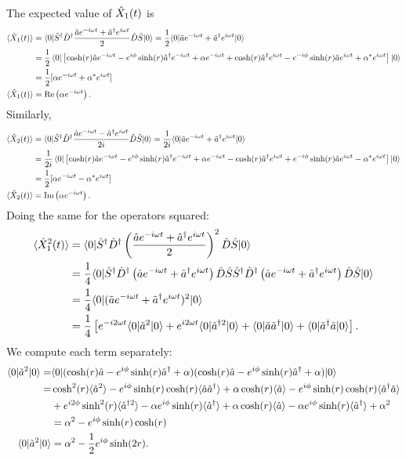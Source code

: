 The expected value of $\hat{X}_1(t)$ is 
\begin{align*}
\langle\hat{X}_1(t)\rangle&=\langle0|\hat{S}^\dagger\hat{D}^\dagger\frac{\hat{a} e^{-i\omega t}+\hat{a}^\dagger e^{i\omega t}}{2}\hat{D}\hat{S}|0\rangle=\frac{1}{2}\langle0|\tilde{a}e^{-i\omega t}+\tilde{a}^\dagger e^{i\omega t}|0\rangle\\
&=\frac{1}{2}\left\langle0\right|\left[\cosh(r)\hat{a} e^{-i\omega t}-e^{i\phi}\sinh(r)\hat{a}^\dagger e^{-i\omega t}+\alpha e^{-i\omega t}+\cosh(r)\hat{a}^\dagger e^{i\omega t}
-e^{-i\phi}\sinh(r)\hat{a} e^{i\omega t}+\alpha^*e^{i\omega t}\right]\left|0\right\rangle\\
&=\frac{1}{2}[\alpha e^{-i\omega t}+\alpha^*e^{i\omega t}]\\
\langle\hat{X}_1(t)\rangle&=\text{Re}\left(\alpha e^{-i\omega t}\right).
\end{align*}
Similarly,
\begin{align*}
\langle\hat{X}_2(t)\rangle&=\langle0|\hat{S}^\dagger\hat{D}^\dagger\frac{\hat{a} e^{-i\omega t}-\hat{a}^\dagger e^{i\omega t}}{2i}\hat{D}\hat{S}|0\rangle=\frac{1}{2i}\langle0|\tilde{a}e^{-i\omega t}+\tilde{a}^\dagger e^{i\omega t}|0\rangle\\
&=\frac{1}{2i}\left\langle0\right|\left[\cosh(r)\hat{a} e^{-i\omega t}-e^{i\phi}\sinh(r)\hat{a}^\dagger e^{-i\omega t}+\alpha e^{-i\omega t}-\cosh(r)\hat{a}^\dagger e^{i\omega t}
+e^{-i\phi}\sinh(r)\hat{a} e^{i\omega t}-\alpha^*e^{i\omega t}\right]\left|0\right\rangle\\
&=\frac{1}{2}[\alpha e^{-i\omega t}-\alpha^*e^{i\omega t}]\\
\langle\hat{X}_2(t)\rangle&=\text{Im}\left(\alpha e^{-i\omega t}\right).
\end{align*}
Doing the same for the operators squared:
\begin{align*}
\langle\hat{X}_1^2(t)\rangle&=\langle0|\hat{S}^\dagger\hat{D}^\dagger\left(\frac{\hat{a} e^{-i\omega t}+\hat{a}^\dagger e^{i\omega t}}{2}\right)^2\hat{D}\hat{S}|0\rangle\\
&=\frac{1}{4}\langle0|\hat{S}^\dagger\hat{D}^\dagger\left(\hat{a} e^{-i\omega t}+\hat{a}^\dagger e^{i\omega t}\right)\hat{D}\hat{S}\hat{S}^\dagger\hat{D}^\dagger\left(\hat{a} e^{-i\omega t}+\hat{a}^\dagger e^{i\omega t}\right)\hat{D}\hat{S}|0\rangle\\
&=\frac{1}{4}\langle0|(\tilde{a}e^{-i\omega t}+\tilde{a}^\dagger e^{i\omega t})^2|0\rangle\\
&=\frac{1}{4}\left[e^{-i2\omega t}\langle0|\tilde{a}^2|0\rangle+e^{i2\omega t}\langle0|\tilde{a}^{\dagger2}|0\rangle+\langle0|\tilde{a}\tilde{a}^\dagger|0\rangle+\langle0|\tilde{a}^\dagger\tilde{a}|0\rangle\right].
\end{align*}
We compute each term separately:
\begin{align*}
\langle0|\tilde{a}^2|0\rangle=&\langle0|(\cosh(r)\hat{a}-e^{i\phi}\sinh(r)\hat{a}^\dagger+\alpha)(\cosh(r)\hat{a}-e^{i\phi}\sinh(r)\hat{a}^\dagger+\alpha)|0\rangle\\
=&\cosh^2(r)\langle\hat{a}^2\rangle-e^{i\phi}\sinh(r)\cosh(r)\langle\hat{a}\hat{a}^\dagger\rangle+\alpha\cosh(r)\langle\hat{a}\rangle-e^{i\phi}\sinh(r)\cosh(r)\langle\hat{a}^\dagger\hat{a}\rangle\\
&+e^{i2\phi}\sinh^2(r)\langle\hat{a}^{\dagger2}\rangle-\alpha e^{i\phi}\sinh(r)\langle\hat{a}^\dagger\rangle+\alpha\cosh(r)\langle\hat{a}\rangle-\alpha e^{i\phi}\sinh(r)\langle\hat{a}^\dagger\rangle+\alpha^2\\
&=\alpha^2-e^{i\phi}\sinh(r)\cosh(r)\\
\langle0|\tilde{a}^2|0\rangle&=\alpha^2-\frac{1}{2}e^{i\phi}\sinh(2r).
\end{align*}
